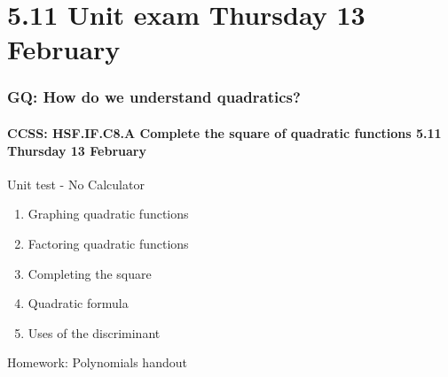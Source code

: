 \documentclass{beamer}
\begin{document}
\section{5.11 Unit exam \hfill Thursday 13 February}
\frame
{
  \frametitle{GQ: How do we understand quadratics?}
  \framesubtitle{CCSS: HSF.IF.C8.A Complete the square of quadratic functions \hfill \alert{5.11  Thursday 13 February}}

  \begin{block}{Unit test - No Calculator}
    \begin{enumerate}
      \item Graphing quadratic functions
      \item Factoring quadratic functions
      \item Completing the square
      \item Quadratic formula
      \item Uses of the discriminant
    \end{enumerate}
    \end{block}
    Homework: Polynomials handout
    }
\end{document}
